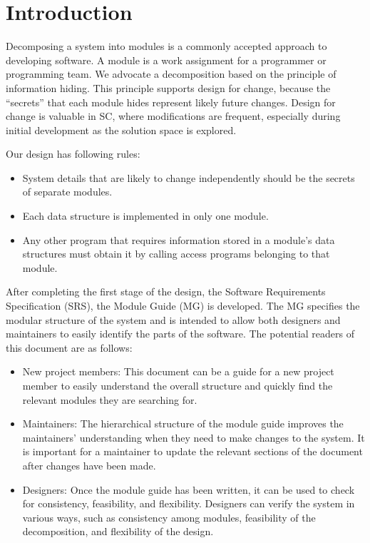 \documentclass[12pt, titlepage]{article}
\begin{document}

\section{Introduction}

Decomposing a system into modules is a commonly accepted approach to developing
software.  A module is a work assignment for a programmer or programming
team.  We advocate a decomposition
based on the principle of information hiding.  This
principle supports design for change, because the ``secrets'' that each module
hides represent likely future changes.  Design for change is valuable in SC,
where modifications are frequent, especially during initial development as the
solution space is explored.  

Our design has following rules:
\begin{itemize}
\item System details that are likely to change independently should be the
  secrets of separate modules.
\item Each data structure is implemented in only one module.
\item Any other program that requires information stored in a module's data
  structures must obtain it by calling access programs belonging to that module.
\end{itemize}

After completing the first stage of the design, the Software Requirements
Specification (SRS), the Module Guide (MG) is developed. The MG
specifies the modular structure of the system and is intended to allow both
designers and maintainers to easily identify the parts of the software.  The
potential readers of this document are as follows:

\begin{itemize}
\item New project members: This document can be a guide for a new project member
  to easily understand the overall structure and quickly find the
  relevant modules they are searching for.
\item Maintainers: The hierarchical structure of the module guide improves the
  maintainers' understanding when they need to make changes to the system. It is
  important for a maintainer to update the relevant sections of the document
  after changes have been made.
\item Designers: Once the module guide has been written, it can be used to
  check for consistency, feasibility, and flexibility. Designers can verify the
  system in various ways, such as consistency among modules, feasibility of the
  decomposition, and flexibility of the design.
\end{itemize}
\end{document}
